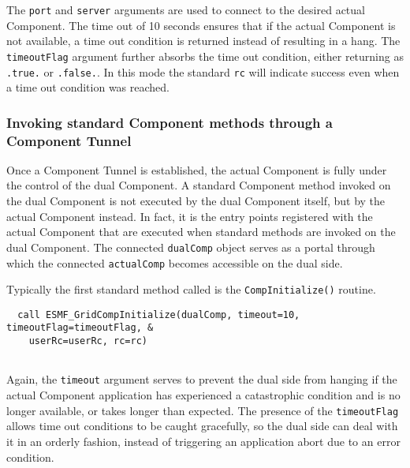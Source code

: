    The {\tt port} and {\tt server} arguments are used to connect to the desired
   actual Component. The time out of 10 seconds ensures that if the actual
   Component is not available, a time out condition is returned instead of
   resulting in a hang. The {\tt timeoutFlag} argument further absorbs the time
   out condition, either returning as {\tt .true.} or {\tt .false.}. In this mode
   the standard {\tt rc} will indicate success even when a time out condition
   was reached. 

  \subsubsection{Invoking standard Component methods through a Component Tunnel}
   
   \label{sec:CompTunnelInvoking}
  
   Once a Component Tunnel is established, the actual Component is fully under
   the control of the dual Component. A standard Component method invoked on the
   dual Component is not executed by the dual Component itself, but by the 
   actual Component instead. In fact, it is the entry points registered with
   the actual Component that are executed when standard methods are invoked on
   the dual Component. The connected {\tt dualComp} object serves as a portal
   through which the connected {\tt actualComp} becomes accessible on the dual
   side.
  
   Typically the first standard method called is the {\tt CompInitialize()}
   routine. 

 \begin{verbatim}
  call ESMF_GridCompInitialize(dualComp, timeout=10, timeoutFlag=timeoutFlag, &
    userRc=userRc, rc=rc)
 
\end{verbatim}
 

   Again, the {\tt timeout} argument serves to prevent the dual side from 
   hanging if the actual Component application has experienced a catastrophic
   condition and is no longer available, or takes longer than expected. The
   presence of the {\tt timeoutFlag} allows time out conditions to be caught
   gracefully, so the dual side can deal with it in an orderly fashion, instead
   of triggering an application abort due to an error condition.
  
